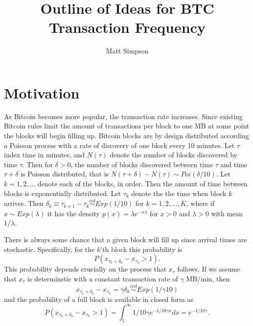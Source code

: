 \documentclass{article}
\author{Matt Simpson}
\title{Outline of Ideas for BTC Transaction Frequency}
\begin{document}
\maketitle




\section{Motivation}
As Bitcoin becomes more popular, the transaction rate increases. Since existing Bitcoin rules limit the amount of transactions per block to one MB at some point the blocks will begin filling up. Bitcoin blocks are by design distributed according a Poisson process with a rate of discovery of one block every 10 minutes. Let $\tau$ index time in minutes, and $N(\tau)$ denote the number of blocks discovered by time $\tau$. Then for $\delta > 0$, the number of blocks discovered between time $\tau$ and time $\tau + \delta$ is Poisson distributed, that is $N(\tau + \delta) - N(\tau) \sim Poi(\delta/10)$. Let $k=1,2,\dots$ denote each of the blocks, in order. Then the amount of time between blocks is exponentially distributed. Let $\tau_k$ denote the the time when block $k$ arrives. Then $\delta_k \equiv \tau_{k+1} - \tau_{k} \stackrel{iid}{\sim} Exp(1/10)$ for $k=1,2,\dots,K$, where if $x\sim Exp(\lambda)$ it has the density $p(x) = \lambda e^{-x\lambda}$ for $x>0$ and $\lambda>0$ with mean $1/\lambda$. 

There is always some chance that a given block will fill up since arrival times are stochastic. Specifically, for the $k$'th block this probability is
\[
P\left(x_{\tau_k + \delta_k} - x_{\tau_k} > 1\right).
\]
This probability depends crucially on the process that $x_\tau$ follows. If we assume that $x_{\tau}$ is determinstic with a constant transaction rate of $\gamma$ MB/min, then 
\[
x_{\tau_k + \delta_k} - x_{\tau_k} = \gamma\delta_k \stackrel{ind}{\sim} Exp(1/\gamma 10)
\]
and the probability of a full block is available in closed form as
\[
P\left(x_{\tau_k + \delta_k} - x_{\tau_k} > 1\right) = \int_1^\infty 1/10\gamma e^{-1/10\gamma x}dx = e^{-1/10\gamma}.
\]
\end{document}

